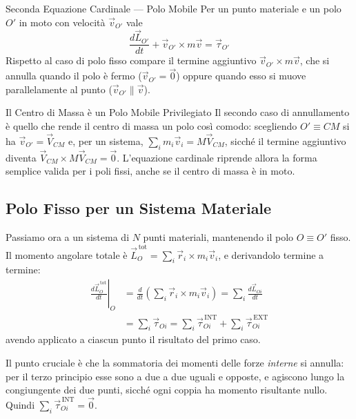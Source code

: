 \begin{teorema}{Seconda Equazione Cardinale --- Polo Mobile}
Per un punto materiale e un polo $O'$ in moto con velocità $\vec{v}_{O'}$ vale
\begin{equation}
    \frac{d\vec{L}_{O'}}{dt} + \vec{v}_{O'} \times m\vec{v} = \vec{\tau}_{O'}
\end{equation}
Rispetto al caso di polo fisso compare il termine aggiuntivo $\vec{v}_{O'} \times m\vec{v}$, che si annulla quando il polo è fermo ($\vec{v}_{O'} = \vec{0}$) oppure quando esso si muove parallelamente al punto ($\vec{v}_{O'} \parallel \vec{v}$).
\end{teorema}

\begin{osservazione}{Il Centro di Massa è un Polo Mobile Privilegiato}
Il secondo caso di annullamento è quello che rende il centro di massa un polo così comodo: scegliendo $O' \equiv CM$ si ha $\vec{v}_{O'} = \vec{V}_{CM}$ e, per un sistema, $\sum_i m_i\vec{v}_i = M\vec{V}_{CM}$, sicché il termine aggiuntivo diventa $\vec{V}_{CM} \times M\vec{V}_{CM} = \vec{0}$. L'equazione cardinale riprende allora la forma semplice valida per i poli fissi, anche se il centro di massa è in moto.
\end{osservazione}

\subsection{Polo Fisso per un Sistema Materiale}

Passiamo ora a un sistema di $N$ punti materiali, mantenendo il polo $O \equiv O'$ fisso. Il momento angolare totale è $\vec{L}_O^{\,\text{tot}} = \sum_i \vec{r}_i \times m_i \vec{v}_i$, e derivandolo termine a termine:
\begin{align}
    \left. \frac{d\vec{L}_O^{\,\text{tot}}}{dt} \right|_{O}
    &= \frac{d}{dt}\left( \sum_i \vec{r}_i \times m_i \vec{v}_i \right)
     = \sum_i \frac{d\vec{L}_{Oi}}{dt} \\
    &= \sum_i \vec{\tau}_{Oi}
     = \sum_i \vec{\tau}_{Oi}^{\,\text{INT}} + \sum_i \vec{\tau}_{Oi}^{\,\text{EXT}}
\end{align}
avendo applicato a ciascun punto il risultato del primo caso.

Il punto cruciale è che la sommatoria dei momenti delle forze \emph{interne} si annulla: per il terzo principio esse sono a due a due uguali e opposte, e agiscono lungo la congiungente dei due punti, sicché ogni coppia ha momento risultante nullo. Quindi $\sum_i \vec{\tau}_{Oi}^{\,\text{INT}} = \vec{0}$.

